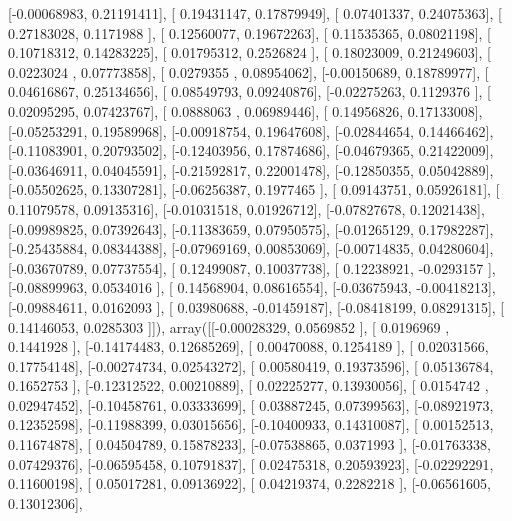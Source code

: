 \documentclass{article}
\begin{document}
       [-0.00068983,  0.21191411],
       [ 0.19431147,  0.17879949],
       [ 0.07401337,  0.24075363],
       [ 0.27183028,  0.1171988 ],
       [ 0.12560077,  0.19672263],
       [ 0.11535365,  0.08021198],
       [ 0.10718312,  0.14283225],
       [ 0.01795312,  0.2526824 ],
       [ 0.18023009,  0.21249603],
       [ 0.0223024 ,  0.07773858],
       [ 0.0279355 ,  0.08954062],
       [-0.00150689,  0.18789977],
       [ 0.04616867,  0.25134656],
       [ 0.08549793,  0.09240876],
       [-0.02275263,  0.1129376 ],
       [ 0.02095295,  0.07423767],
       [ 0.0888063 ,  0.06989446],
       [ 0.14956826,  0.17133008],
       [-0.05253291,  0.19589968],
       [-0.00918754,  0.19647608],
       [-0.02844654,  0.14466462],
       [-0.11083901,  0.20793502],
       [-0.12403956,  0.17874686],
       [-0.04679365,  0.21422009],
       [-0.03646911,  0.04045591],
       [-0.21592817,  0.22001478],
       [-0.12850355,  0.05042889],
       [-0.05502625,  0.13307281],
       [-0.06256387,  0.1977465 ],
       [ 0.09143751,  0.05926181],
       [ 0.11079578,  0.09135316],
       [-0.01031518,  0.01926712],
       [-0.07827678,  0.12021438],
       [-0.09989825,  0.07392643],
       [-0.11383659,  0.07950575],
       [-0.01265129,  0.17982287],
       [-0.25435884,  0.08344388],
       [-0.07969169,  0.00853069],
       [-0.00714835,  0.04280604],
       [-0.03670789,  0.07737554],
       [ 0.12499087,  0.10037738],
       [ 0.12238921, -0.0293157 ],
       [-0.08899963,  0.0534016 ],
       [ 0.14568904,  0.08616554],
       [-0.03675943, -0.00418213],
       [-0.09884611,  0.0162093 ],
       [ 0.03980688, -0.01459187],
       [-0.08418199,  0.08291315],
       [ 0.14146053,  0.0285303 ]]), array([[-0.00028329,  0.0569852 ],
       [ 0.0196969 ,  0.1441928 ],
       [-0.14174483,  0.12685269],
       [ 0.00470088,  0.1254189 ],
       [ 0.02031566,  0.17754148],
       [-0.00274734,  0.02543272],
       [ 0.00580419,  0.19373596],
       [ 0.05136784,  0.1652753 ],
       [-0.12312522,  0.00210889],
       [ 0.02225277,  0.13930056],
       [ 0.0154742 ,  0.02947452],
       [-0.10458761,  0.03333699],
       [ 0.03887245,  0.07399563],
       [-0.08921973,  0.12352598],
       [-0.11988399,  0.03015656],
       [-0.10400933,  0.14310087],
       [ 0.00152513,  0.11674878],
       [ 0.04504789,  0.15878233],
       [-0.07538865,  0.0371993 ],
       [-0.01763338,  0.07429376],
       [-0.06595458,  0.10791837],
       [ 0.02475318,  0.20593923],
       [-0.02292291,  0.11600198],
       [ 0.05017281,  0.09136922],
       [ 0.04219374,  0.2282218 ],
       [-0.06561605,  0.13012306],
\end{document}
